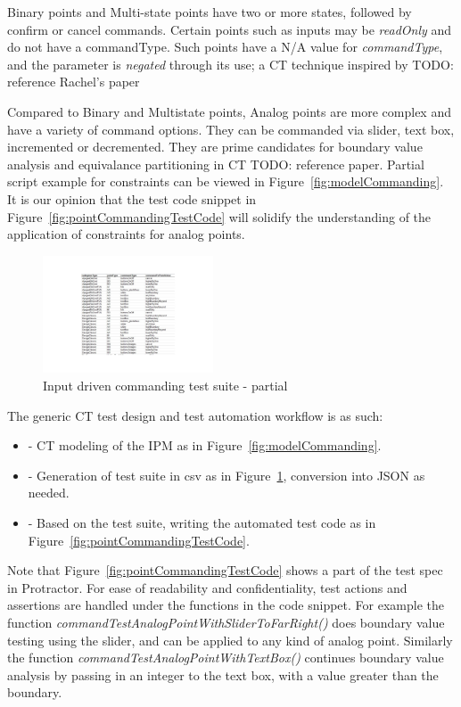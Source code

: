 \documentclass[conference]{IEEEtran}
\newcommand{\todo}[1]{}
\renewcommand{\todo}[1]{{\color{red} TODO: {#1}}}
\begin{document}
	Binary points and Multi-state points have two or more states, followed by confirm or cancel commands. 
	Certain points such as inputs may be \textit{readOnly} and do not have a commandType. Such points have a N/A value for \textit{commandType}, and the parameter is \textit{negated} through its use; a CT technique inspired by \todo{reference Rachel's paper}	

	Compared to  Binary and Multistate points, Analog points are more complex and have a variety of command options.
	They can be commanded via slider, text box, incremented or decremented. 
	They are prime candidates for boundary value analysis and equivalance partitioning in CT \todo{reference paper}.
	Partial script example for constraints can be viewed in Figure~\ref{fig:modelCommanding}. 
	It is our opinion that the test code snippet in Figure~\ref{fig:pointCommandingTestCode} will solidify the understanding of the application of constraints for analog points.

	\begin{figure}[!h]
		\includegraphics[width=0.45\textwidth,]{csvOutputCommanding.pdf}
	\caption{Input driven commanding test suite - partial}
	\label{fig:csvOutputCommanding}
	\end{figure}

	The generic CT test design and test automation workflow is as such:
	\begin{itemize}
		\item [] - CT modeling of the IPM as in Figure~\ref{fig:modelCommanding}.
		\item [] - Generation of test suite in csv as in Figure~\ref{fig:csvOutputCommanding}, conversion into JSON as needed.
		\item [] - Based on the test suite, writing the automated test code as in Figure~\ref{fig:pointCommandingTestCode}.
	\end{itemize}

	Note that Figure~\ref{fig:pointCommandingTestCode} shows a part of the test spec in Protractor. 
	For ease of readability and confidentiality, test actions and assertions are handled under the functions in the code snippet. 
	For example the function \textit{commandTestAnalogPointWithSliderToFarRight()} does boundary value testing using the slider, and can be applied to any kind of analog point.
	Similarly the function \textit{commandTestAnalogPointWithTextBox()} continues boundary value analysis by passing in an integer to the text box, with a value greater than the boundary.
\end{document}
